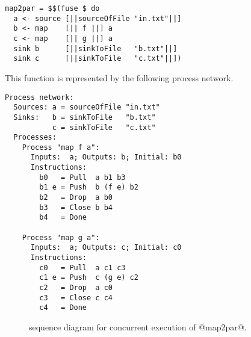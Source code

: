 \begin{lstlisting}
map2par = $$(fuse $ do
  a <- source [||sourceOfFile "in.txt"||]
  b <- map    [|| f ||] a
  c <- map    [|| g ||] a
  sink b      [||sinkToFile   "b.txt"||]
  sink c      [||sinkToFile   "c.txt"||])
\end{lstlisting}

This function is represented by the following process network.

\begin{lstlisting}[linebackgroundcolor={
  \hilineFst{9}
  \hilineFst{10}
  \hilineFst{11}
  \hilineFst{12}
  \hilineFst{13}
  \hilineSnd{18}
  \hilineSnd{19}
  \hilineSnd{20}
  \hilineSnd{21}
  \hilineSnd{22}
  }]
Process network:
  Sources: a = sourceOfFile "in.txt"
  Sinks:   b = sinkToFile   "b.txt"
           c = sinkToFile   "c.txt"
  Processes:
    Process "map f a":
      Inputs:  a; Outputs: b; Initial: b0
      Instructions:
        b0   = Pull  a b1 b3
        b1 e = Push  b (f e) b2
        b2   = Drop  a b0
        b3   = Close b b4        
        b4   = Done

    Process "map g a":
      Inputs:  a; Outputs: c; Initial: c0
      Instructions:
        c0   = Pull  a c1 c3      
        c1 e = Push  c (g e) c2     
        c2   = Drop  a c0
        c3   = Close c c4         
        c4   = Done
\end{lstlisting}


\begin{figure}
\center
\begin{sequencediagram}




\end{sequencediagram}
\caption[Concurrent sequence diagram for parallel maps]{sequence diagram for concurrent execution of @map2par@. }
\label{figs/swim/map2par}
\end{figure}

